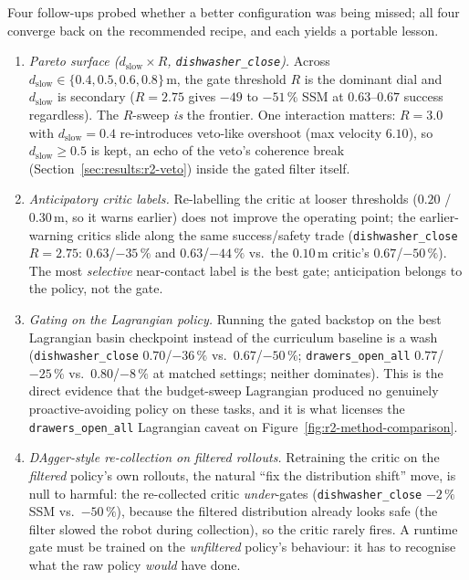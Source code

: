 \documentclass[11pt,a4paper]{report}
\newcommand{\ssm}{SSM}
\begin{document}
Four follow-ups probed whether a better configuration was being
missed; all four converge back on the recommended recipe, and each
yields a portable lesson.

\begin{enumerate}[topsep=2pt,itemsep=2pt]
\item \emph{Pareto surface ($d_{\mathrm{slow}} \times R$,
  \texttt{dishwasher\_close}).} Across $d_{\mathrm{slow}} \in \{0.4, 0.5, 0.6,
  0.8\}$\,m, the gate threshold $R$ is the dominant dial and
  $d_{\mathrm{slow}}$ is secondary ($R = 2.75$ gives $-49$ to
  $-51\,\%$ \ssm{} at $0.63$--$0.67$ success regardless). The
  $R$-sweep \emph{is} the frontier. One interaction matters:
  $R = 3.0$ with $d_{\mathrm{slow}} = 0.4$ re-introduces veto-like
  overshoot (max velocity $6.10$), so $d_{\mathrm{slow}} \geq 0.5$
  is kept, an echo of the veto's coherence break
  (Section~\ref{sec:results:r2-veto}) inside the gated filter
  itself.
\item \emph{Anticipatory critic labels.} Re-labelling the critic at
  looser thresholds ($0.20$ / $0.30$\,m, so it warns earlier) does
  not improve the operating point; the earlier-warning critics slide
  along the same success/safety trade (\texttt{dishwasher\_close} $R = 2.75$:
  $0.63$/$-35\,\%$ and $0.63$/$-44\,\%$ vs.\ the $0.10$\,m critic's
  $0.67$/$-50\,\%$). The most \emph{selective} near-contact label is
  the best gate; anticipation belongs to the policy, not the gate.
\item \emph{Gating on the Lagrangian policy.} Running the gated
  backstop on the best Lagrangian basin checkpoint instead of the
  curriculum baseline is a wash (\texttt{dishwasher\_close} $0.70$/$-36\,\%$ vs.\
  $0.67$/$-50\,\%$; \texttt{drawers\_open\_all} $0.77$/$-25\,\%$ vs.\ $0.80$/$-8\,\%$ at
  matched settings; neither dominates). This is the direct evidence
  that the budget-sweep Lagrangian produced no genuinely
  proactive-avoiding policy on these tasks, and it is what licenses
  the \texttt{drawers\_open\_all} Lagrangian caveat on
  Figure~\ref{fig:r2-method-comparison}.
\item \emph{DAgger-style re-collection on filtered rollouts.}
  Retraining the critic on the \emph{filtered} policy's own rollouts,
  the natural ``fix the distribution shift'' move, is null to
  harmful: the re-collected critic \emph{under}-gates (\texttt{dishwasher\_close}
  $-2\,\%$ \ssm{} vs.\ $-50\,\%$), because the filtered distribution
  already looks safe (the filter slowed the robot during
  collection), so the critic rarely fires. A runtime gate must be
  trained on the \emph{unfiltered} policy's behaviour: it has to
  recognise what the raw policy \emph{would} have done.
\end{enumerate}
\end{document}
